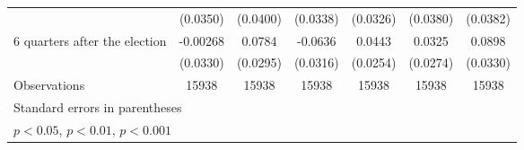 \begin{table}[htbp]
\begin{tabular}{l*{6}{c}}
                    &    (0.0350)         &    (0.0400)         &    (0.0338)         &    (0.0326)         &    (0.0380)         &    (0.0382)         \\
[1em]
 6 quarters after the election&    -0.00268         &      0.0784\sym{**} &     -0.0636\sym{*}  &      0.0443         &      0.0325         &      0.0898\sym{**} \\
                    &    (0.0330)         &    (0.0295)         &    (0.0316)         &    (0.0254)         &    (0.0274)         &    (0.0330)         \\
\hline
Observations        &       15938         &       15938         &       15938         &       15938         &       15938         &       15938         \\
\hline\hline
\multicolumn{7}{l}{\footnotesize Standard errors in parentheses}\\
\multicolumn{7}{l}{\footnotesize \sym{*} \(p<0.05\), \sym{**} \(p<0.01\), \sym{***} \(p<0.001\)}\\
\end{tabular}
\end{table}
